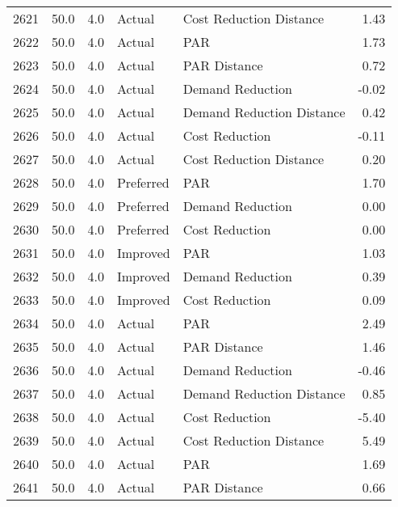 \begin{longtable}{lrrllr}
2621 &         50.0 &     4.0 &         Actual &    Cost Reduction Distance &   1.43 \\
2622 &         50.0 &     4.0 &         Actual &                        PAR &   1.73 \\
2623 &         50.0 &     4.0 &         Actual &               PAR Distance &   0.72 \\
2624 &         50.0 &     4.0 &         Actual &           Demand Reduction &  -0.02 \\
2625 &         50.0 &     4.0 &         Actual &  Demand Reduction Distance &   0.42 \\
2626 &         50.0 &     4.0 &         Actual &             Cost Reduction &  -0.11 \\
2627 &         50.0 &     4.0 &         Actual &    Cost Reduction Distance &   0.20 \\
2628 &         50.0 &     4.0 &      Preferred &                        PAR &   1.70 \\
2629 &         50.0 &     4.0 &      Preferred &           Demand Reduction &   0.00 \\
2630 &         50.0 &     4.0 &      Preferred &             Cost Reduction &   0.00 \\
2631 &         50.0 &     4.0 &       Improved &                        PAR &   1.03 \\
2632 &         50.0 &     4.0 &       Improved &           Demand Reduction &   0.39 \\
2633 &         50.0 &     4.0 &       Improved &             Cost Reduction &   0.09 \\
2634 &         50.0 &     4.0 &         Actual &                        PAR &   2.49 \\
2635 &         50.0 &     4.0 &         Actual &               PAR Distance &   1.46 \\
2636 &         50.0 &     4.0 &         Actual &           Demand Reduction &  -0.46 \\
2637 &         50.0 &     4.0 &         Actual &  Demand Reduction Distance &   0.85 \\
2638 &         50.0 &     4.0 &         Actual &             Cost Reduction &  -5.40 \\
2639 &         50.0 &     4.0 &         Actual &    Cost Reduction Distance &   5.49 \\
2640 &         50.0 &     4.0 &         Actual &                        PAR &   1.69 \\
2641 &         50.0 &     4.0 &         Actual &               PAR Distance &   0.66 \\

\end{longtable}
